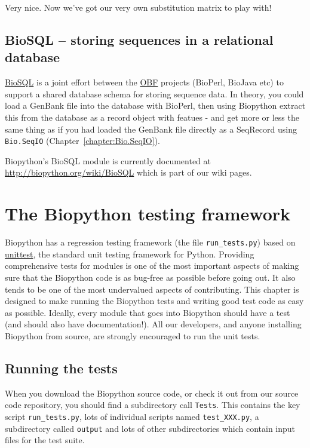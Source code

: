 \documentclass{report}
\begin{document}
Very nice. Now we've got our very own substitution matrix to play with!

\section{BioSQL -- storing sequences in a relational database}
\label{sec:BioSQL}
\href{http://www.biosql.org/}{BioSQL} is a joint effort between the
\href{http://open-bio.org/}{OBF} projects (BioPerl, BioJava etc) to support a
shared database schema for storing sequence data. In theory, you could load a
GenBank file into the database with BioPerl, then using Biopython extract this
from the database as a record object with featues - and get more or less the same
thing as if you had loaded the GenBank file directly as a SeqRecord using
\verb|Bio.SeqIO| (Chapter~\ref{chapter:Bio.SeqIO}).

Biopython's BioSQL module is currently documented at
\url{http://biopython.org/wiki/BioSQL} which is part of our wiki pages.

\chapter{The Biopython testing framework}
\label{sec:regr_test}

Biopython has a regression testing framework (the file
\verb|run_tests.py|) based on
\href{http://docs.python.org/library/unittest.html}{unittest},
the standard unit testing framework for Python.  Providing comprehensive
tests for modules is one of the most important aspects of making sure that
the Biopython code is as bug-free as possible before going out.
It also tends to be one of the most undervalued aspects of contributing.
This chapter is designed to make running the Biopython tests and
writing good test code as easy as possible.
Ideally, every module that goes into Biopython
should have a test (and should also have documentation!).
All our developers, and anyone installing Biopython from source,
are strongly encouraged to run the unit tests.

\section{Running the tests}

When you download the Biopython source code, or check it out from
our source code repository, you should find a subdirectory call
\verb|Tests|.  This contains the key script \verb|run_tests.py|,
lots of individual scripts named \verb|test_XXX.py|, a subdirectory
called \verb|output| and lots of other subdirectories which
contain input files for the test suite.
\end{document}
